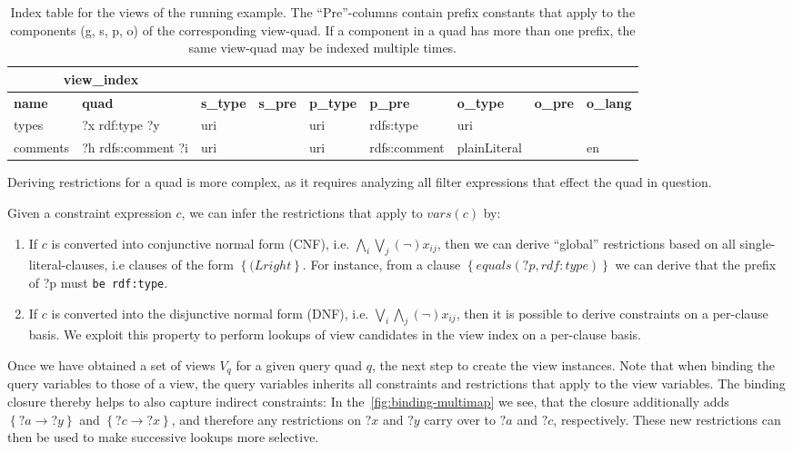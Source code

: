 \documentclass[a4paper,twoside,bibtotoc,abstracton,12pt,BCOR=15mm]{scrreprt}
\newcommand{\todo}[1]{\textbf{ToDo: \textit{#1}}}
\begin{document}
\begin{table}
\begin{scriptsize}
\begin{tabular}{|lllllllll|} \cline{1-2}
\multicolumn{2}{|c|}{view\_index} \\ \hline
\textbf{name} & \textbf{quad} & \textbf{s\_type} & \textbf{s\_pre} & \textbf{p\_type} & \textbf{p\_pre} & \textbf{o\_type} & \textbf{o\_pre} & \textbf{o\_lang} \\ \hline
types & ?x rdf:type ?y & uri & & uri & rdfs:type & uri & & \\
comments & ?h rdfs:comment ?i & uri & & uri & rdfs:comment & plainLiteral & & en \\
\bottomrule
\end{tabular}
\end{scriptsize}
\caption{Index table for the views of the running example. The ``Pre''-columns contain prefix constants that apply to the components (g, s, p, o) of the corresponding view-quad.
If a component in a quad has more than one prefix, the same view-quad may be indexed multiple times.}
\label{tab:view-index}
\end{table}


Deriving restrictions for a quad is more complex, as it requires analyzing all filter expressions that effect the quad in question.

Given a constraint expression $c$, we can infer the restrictions that apply to $vars(c)$ by:
\begin{enumerate}
  \item If $c$ is converted into conjunctive normal form (CNF), i.e. $\bigwedge_{i} \bigvee_{j} (\lnot) x_{ij}$,
  then we can derive ``global'' restrictions based on all single-literal-clauses, i.e clauses of the form $\left \{ (L right \right \}$.
  For instance, from a clause $\left \{ equals \left ( ?p, rdf:type \right ) \right \}$ we can derive that the prefix of ?p must \texttt{be rdf:type}.
  \item If $c$ is converted into the disjunctive normal form (DNF), i.e. $\bigvee_{i} \bigwedge_{j} (\lnot) x_{ij}$, then it is possible to derive
  constraints on a per-clause basis. We exploit this property to perform lookups of view candidates in the view index on a per-clause basis. 
\end{enumerate}



Once we have obtained a set of views $V_q$ for a given query quad $q$, the next step to create the view instances.
Note that when binding the query variables to those of a view, the query variables inherits all constraints and restrictions that apply to the view variables.
The binding closure thereby helps to also capture indirect constraints: In the~\autoref{fig:binding-multimap} we see, that the closure additionally
adds $\left \{?a \rightarrow ?y \right \}$ and $\left \{?c \rightarrow ?x \right \}$, and therefore any restrictions on
$?x$ and $?y$ carry over to $?a$ and $?c$, respectively.
These new restrictions can then be used to make successive lookups more selective.
\end{document}
